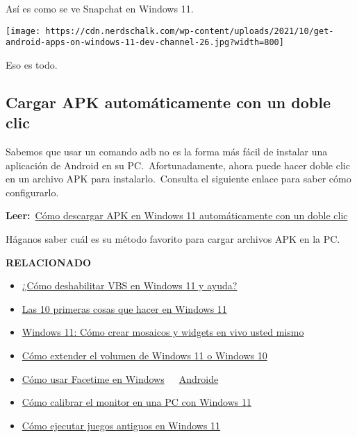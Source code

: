 \documentclass[
  letterpaper,
]{article}
\providecommand{\tightlist}{%
  \setlength{\itemsep}{0pt}\setlength{\parskip}{0pt}}\usepackage{longtable,booktabs,array}
\begin{document}
Así es como se ve Snapchat en Windows 11.

\texttt{[image: https://cdn.nerdschalk.com/wp-content/uploads/2021/10/get-android-apps-on-windows-11-dev-channel-26.jpg?width=800]}

Eso es todo.

\hypertarget{cargar-apk-automuxe1ticamente-con-un-doble-clic}{%
\subsection{Cargar APK automáticamente con un doble
clic}\label{cargar-apk-automuxe1ticamente-con-un-doble-clic}}

Sabemos que usar un comando adb no es la forma más fácil de instalar una
aplicación de Android en su PC.~Afortunadamente, ahora puede hacer doble
clic en un archivo APK para instalarlo.~Consulta el siguiente enlace
para saber cómo configurarlo.

\textbf{Leer:}~\href{https://nerdschalk.com/how-to-sideload-apk-on-windows-11-automatically-with-a-double-click/}{Cómo
descargar APK en Windows 11 automáticamente con un doble clic}

Háganos saber cuál es su método favorito para cargar archivos APK en la
PC.

\textbf{RELACIONADO}

\begin{itemize}
\tightlist
\item
  \href{https://nerdschalk.com/how-to-disable-vbs-on-windows-11-and-does-it-help/}{¿Cómo
  deshabilitar VBS en Windows 11 y ayuda?}
\item
  \href{https://nerdschalk.com/first-10-things-to-do-on-windows-11/}{Las
  10 primeras cosas que hacer en Windows 11}
\item
  \href{https://nerdschalk.com/windows-11-how-to-create-live-tiles-and-widgets/}{Windows
  11: Cómo crear mosaicos y widgets en vivo usted mismo}
\item
  \href{https://nerdschalk.com/how-to-extend-volume-windows-11-or-windows-10/}{Cómo
  extender el volumen de Windows 11 o Windows 10}
\item
  \href{https://nerdschalk.com/how-to-facetime-windows-users/}{Cómo usar
  Facetime en
  Windows}~~\textbar~\href{https://nerdschalk.com/how-to-facetime-android-users/}{Androide}
\item
  \href{https://nerdschalk.com/how-to-calibrate-monitor-on-windows-11-pc/}{Cómo
  calibrar el monitor en una PC con Windows 11}
\item
  \href{https://nerdschalk.com/how-to-run-old-games-on-windows-11/}{Cómo
  ejecutar juegos antiguos en Windows 11}
\end{itemize}
\end{document}
